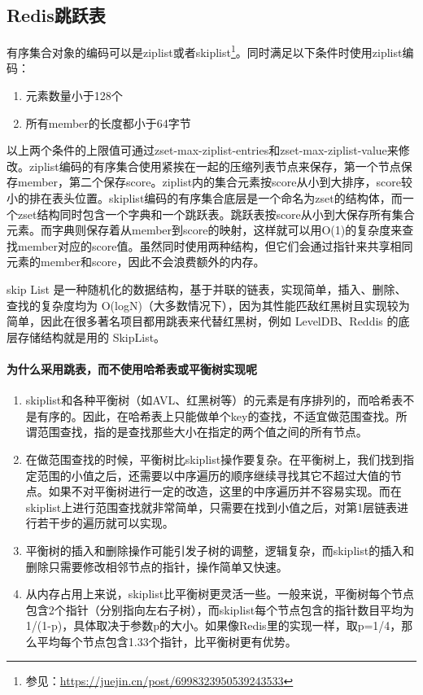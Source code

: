 \documentclass[../../../interview-questions.tex]{subfiles}
\begin{document}
\subsection{Redis跳跃表}

有序集合对象的编码可以是ziplist或者skiplist\footnote{参见：\url{https://juejin.cn/post/6998323950539243533}}。同时满足以下条件时使用ziplist编码：

\begin{enumerate}
    \item {元素数量小于128个}
    \item {所有member的长度都小于64字节}
\end{enumerate}

以上两个条件的上限值可通过zset-max-ziplist-entries和zset-max-ziplist-value来修改。ziplist编码的有序集合使用紧挨在一起的压缩列表节点来保存，第一个节点保存member，第二个保存score。ziplist内的集合元素按score从小到大排序，score较小的排在表头位置。skiplist编码的有序集合底层是一个命名为zset的结构体，而一个zset结构同时包含一个字典和一个跳跃表。跳跃表按score从小到大保存所有集合元素。而字典则保存着从member到score的映射，这样就可以用O(1)的复杂度来查找member对应的score值。虽然同时使用两种结构，但它们会通过指针来共享相同元素的member和score，因此不会浪费额外的内存。

skip List 是一种随机化的数据结构，基于并联的链表，实现简单，插入、删除、查找的复杂度均为 O(logN)（大多数情况下），因为其性能匹敌红黑树且实现较为简单，因此在很多著名项目都用跳表来代替红黑树，例如 LevelDB、Reddis 的底层存储结构就是用的 SkipList。

\paragraph{为什么采用跳表，而不使用哈希表或平衡树实现呢}

\begin{enumerate}
    \item {skiplist和各种平衡树（如AVL、红黑树等）的元素是有序排列的，而哈希表不是有序的。因此，在哈希表上只能做单个key的查找，不适宜做范围查找。所谓范围查找，指的是查找那些大小在指定的两个值之间的所有节点。}
    \item {在做范围查找的时候，平衡树比skiplist操作要复杂。在平衡树上，我们找到指定范围的小值之后，还需要以中序遍历的顺序继续寻找其它不超过大值的节点。如果不对平衡树进行一定的改造，这里的中序遍历并不容易实现。而在skiplist上进行范围查找就非常简单，只需要在找到小值之后，对第1层链表进行若干步的遍历就可以实现。}
    \item {平衡树的插入和删除操作可能引发子树的调整，逻辑复杂，而skiplist的插入和删除只需要修改相邻节点的指针，操作简单又快速。}
    \item {从内存占用上来说，skiplist比平衡树更灵活一些。一般来说，平衡树每个节点包含2个指针（分别指向左右子树），而skiplist每个节点包含的指针数目平均为1/(1-p)，具体取决于参数p的大小。如果像Redis里的实现一样，取p=1/4，那么平均每个节点包含1.33个指针，比平衡树更有优势。}
\end{enumerate}
\end{document}
